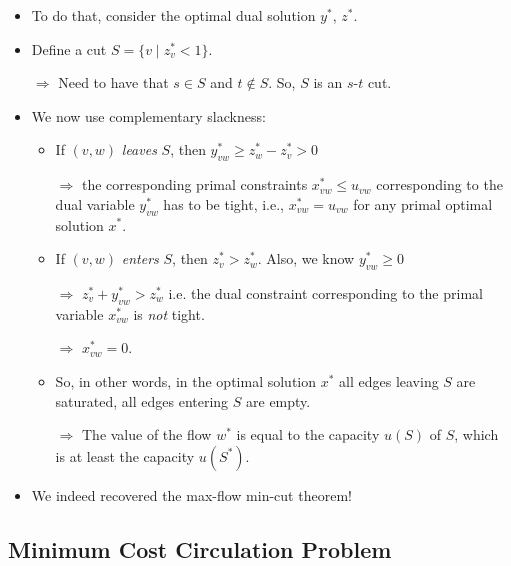 \documentclass{article}
\begin{document}
\begin{itemize}
\item To do that, consider the optimal dual solution $y^*$, $z^*$. 
\item Define a cut $S=\{v \mid z_v^* < 1\}$.

$\Rightarrow$ Need to have that $s\in S$ and $t\notin S$. So, $S$ is an $s$-$t$ cut. 
\item We now use complementary slackness:
\begin{itemize}
\item If $(v,w)$ \emph{leaves} $S$, then $y_{vw}^* \ge z_w^*-z_v^* > 0$

$\Rightarrow$ the corresponding primal constraints $x_{vw}^* \leq u_{vw}$ corresponding to the dual variable $y_{vw}^*$ has to be tight, i.e., $x_{vw}^*=u_{vw}$ for any primal optimal solution $x^*$. 
\item If $(v,w)$ \emph{enters} $S$, then $z_v^*>z_w^*$.  Also, we know $y_{vw}^*\ge 0$
 
 $\Rightarrow$ $z_v^*+y_{vw}^*>z_w^*$ i.e. the dual constraint corresponding to the primal variable $x_{vw}^*$ is {\em not} tight.
 
 $\Rightarrow$ $x_{vw}^*=0$. 
\item So, in other words, in the optimal solution $x^*$ all  edges leaving $S$ are saturated, all edges entering $S$ are empty. 

$\Rightarrow$ The value of the flow $w^*$ is equal to the capacity $u(S)$ of $S$, which is at least the capacity $u(S^*)$. 
\end{itemize}
\item We indeed recovered the max-flow min-cut theorem!
\end{itemize}

\subsection{Minimum Cost Circulation Problem}
\end{document}
